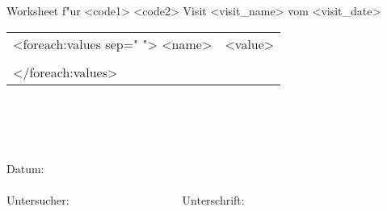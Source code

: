 \documentclass{scrreprt}
\begin{document}
\noindent Worksheet {\it <Voller Titel>} f"ur <code1> <code2> Visit <visit_name> vom <visit_date> \\

\begin{mpsupertabular}{p{5cm}p{9cm}}
\hline
 <foreach:values sep=" ">
<name> &<value>\\
\tabularnewline
</foreach:values>
\hline
\end{mpsupertabular}
~
\\\\ \\\\
\noindent Datum:\\\\
\noindent Untersucher:~~~~~~~~~~~~~~~~~~~~Unterschrift:
\end{document}
